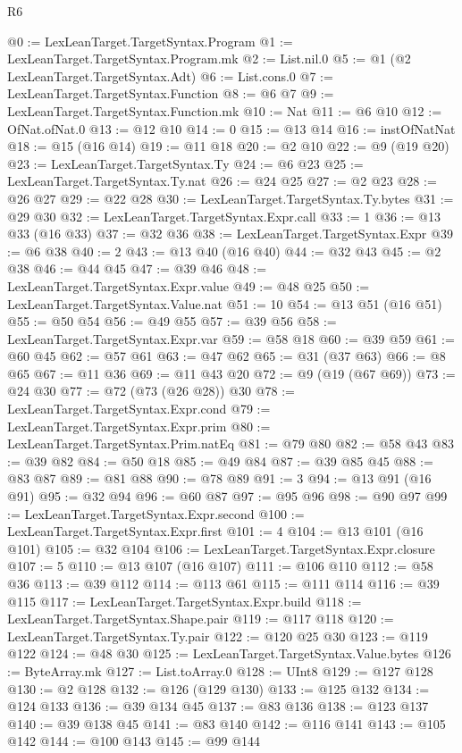 \begin{lexlean}{R6}
\begin{coremodule}
@0 := LexLeanTarget.TargetSyntax.Program
@1 := LexLeanTarget.TargetSyntax.Program.mk
@2 := List.nil.{0}
@5 := @1 (@2 LexLeanTarget.TargetSyntax.Adt)
@6 := List.cons.{0}
@7 := LexLeanTarget.TargetSyntax.Function
@8 := @6 @7
@9 := LexLeanTarget.TargetSyntax.Function.mk
@10 := Nat
@11 := @6 @10
@12 := OfNat.ofNat.{0}
@13 := @12 @10
@14 := 0
@15 := @13 @14
@16 := instOfNatNat
@18 := @15 (@16 @14)
@19 := @11 @18
@20 := @2 @10
@22 := @9 (@19 @20)
@23 := LexLeanTarget.TargetSyntax.Ty
@24 := @6 @23
@25 := LexLeanTarget.TargetSyntax.Ty.nat
@26 := @24 @25
@27 := @2 @23
@28 := @26 @27
@29 := @22 @28
@30 := LexLeanTarget.TargetSyntax.Ty.bytes
@31 := @29 @30
@32 := LexLeanTarget.TargetSyntax.Expr.call
@33 := 1
@36 := @13 @33 (@16 @33)
@37 := @32 @36
@38 := LexLeanTarget.TargetSyntax.Expr
@39 := @6 @38
@40 := 2
@43 := @13 @40 (@16 @40)
@44 := @32 @43
@45 := @2 @38
@46 := @44 @45
@47 := @39 @46
@48 := LexLeanTarget.TargetSyntax.Expr.value
@49 := @48 @25
@50 := LexLeanTarget.TargetSyntax.Value.nat
@51 := 10
@54 := @13 @51 (@16 @51)
@55 := @50 @54
@56 := @49 @55
@57 := @39 @56
@58 := LexLeanTarget.TargetSyntax.Expr.var
@59 := @58 @18
@60 := @39 @59
@61 := @60 @45
@62 := @57 @61
@63 := @47 @62
@65 := @31 (@37 @63)
@66 := @8 @65
@67 := @11 @36
@69 := @11 @43 @20
@72 := @9 (@19 (@67 @69))
@73 := @24 @30
@77 := @72 (@73 (@26 @28)) @30
@78 := LexLeanTarget.TargetSyntax.Expr.cond
@79 := LexLeanTarget.TargetSyntax.Expr.prim
@80 := LexLeanTarget.TargetSyntax.Prim.natEq
@81 := @79 @80
@82 := @58 @43
@83 := @39 @82
@84 := @50 @18
@85 := @49 @84
@87 := @39 @85 @45
@88 := @83 @87
@89 := @81 @88
@90 := @78 @89
@91 := 3
@94 := @13 @91 (@16 @91)
@95 := @32 @94
@96 := @60 @87
@97 := @95 @96
@98 := @90 @97
@99 := LexLeanTarget.TargetSyntax.Expr.second
@100 := LexLeanTarget.TargetSyntax.Expr.first
@101 := 4
@104 := @13 @101 (@16 @101)
@105 := @32 @104
@106 := LexLeanTarget.TargetSyntax.Expr.closure
@107 := 5
@110 := @13 @107 (@16 @107)
@111 := @106 @110
@112 := @58 @36
@113 := @39 @112
@114 := @113 @61
@115 := @111 @114
@116 := @39 @115
@117 := LexLeanTarget.TargetSyntax.Expr.build
@118 := LexLeanTarget.TargetSyntax.Shape.pair
@119 := @117 @118
@120 := LexLeanTarget.TargetSyntax.Ty.pair
@122 := @120 @25 @30
@123 := @119 @122
@124 := @48 @30
@125 := LexLeanTarget.TargetSyntax.Value.bytes
@126 := ByteArray.mk
@127 := List.toArray.{0}
@128 := UInt8
@129 := @127 @128
@130 := @2 @128
@132 := @126 (@129 @130)
@133 := @125 @132
@134 := @124 @133
@136 := @39 @134 @45
@137 := @83 @136
@138 := @123 @137
@140 := @39 @138 @45
@141 := @83 @140
@142 := @116 @141
@143 := @105 @142
@144 := @100 @143
@145 := @99 @144

\end{coremodule}
\end{lexlean}
